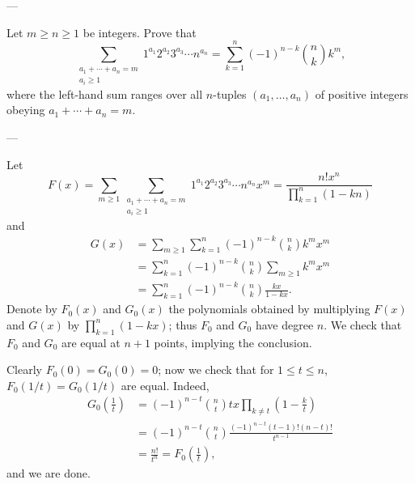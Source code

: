 
---

Let $m\ge n\ge1$ be integers. Prove that \[\sum_{\substack{a_1+\cdots+a_n=m\\ a_i\ge1}}1^{a_1}2^{a_2}3^{a_3}\cdots n^{a_n}=\sum_{k=1}^n(-1)^{n-k}\binom nkk^m,\]
where the left-hand sum ranges over all $n$-tuples $(a_1,\ldots,a_n)$ of positive integers obeying $a_1+\cdots+a_n=m$.

---

Let \[F(x)=\sum_{m\ge1}\sum_{\substack{a_1+\cdots+a_n=m\\ a_i\ge1}}1^{a_1}2^{a_2}3^{a_3}\cdots n^{a_n}x^m=\frac{n!x^n}{\prod_{k=1}^n(1-kn)}\]
and
\begin{align*}
    G(x)&=\sum_{m\ge1}\sum_{k=1}^n(-1)^{n-k}\binom nkk^mx^m\\
    &=\sum_{k=1}^n(-1)^{n-k}\binom nk\sum_{m\ge1}k^mx^m\\
    &=\sum_{k=1}^n(-1)^{n-k}\binom nk\frac{kx}{1-kx}.
\end{align*}
Denote by $F_0(x)$ and $G_0(x)$ the polynomials obtained by multiplying $F(x)$ and $G(x)$ by $\prod_{k=1}^n(1-kx)$; thus $F_0$ and $G_0$ have degree $n$. We check that $F_0$ and $G_0$ are equal at $n+1$ points, implying the conclusion.

Clearly $F_0(0)=G_0(0)=0$; now we check that for $1\le t\le n$, $F_0(1/t)=G_0(1/t)$ are equal. Indeed,
\begin{align*}
    G_0\left(\frac1t\right)&=(-1)^{n-t}\binom nttx\prod_{k\ne t}\left(1-\frac kt\right)\\
    &=(-1)^{n-t}\binom nt\frac{(-1)^{n-t}(t-1)!(n-t)!}{t^{n-1}}\\
    &=\frac{n!}{t^n}=F_0\left(\frac1t\right),
\end{align*}
and we are done.

